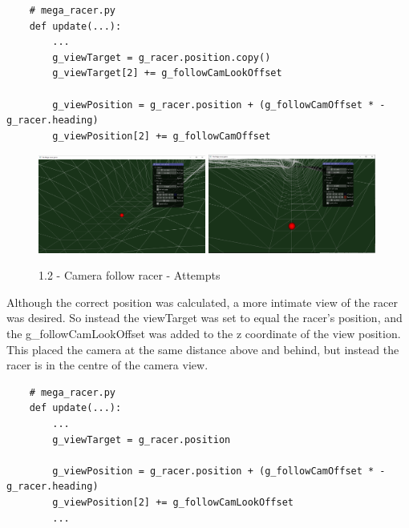 \documentclass[a4 paper, 12pt]{article}
\begin{document}
\begin{lstlisting}
    # mega_racer.py
    def update(...):
        ...
        g_viewTarget = g_racer.position.copy()
        g_viewTarget[2] += g_followCamLookOffset
    
        g_viewPosition = g_racer.position + (g_followCamOffset * -g_racer.heading)
        g_viewPosition[2] += g_followCamOffset
\end{lstlisting}

\begin{figure} [H]
    \includegraphics[width=0.49\textwidth, frame]
        {./images/mega_racer/1.2_1.PNG}
        \includegraphics[width=0.49\textwidth, frame]
        {./images/mega_racer/1.2_2.PNG}
    \caption{1.2 - Camera follow racer - Attempts}
\end{figure}

Although the correct position was calculated, a more intimate view of the racer was desired. So instead the viewTarget was set to equal the racer's position, and the g\_followCamLookOffset was added to the z coordinate of the view position. This placed the camera at the same distance above and behind, but instead the racer is in the centre of the camera view.
    \begin{lstlisting}
    # mega_racer.py
    def update(...):
        ...
        g_viewTarget = g_racer.position

        g_viewPosition = g_racer.position + (g_followCamOffset * -g_racer.heading)
        g_viewPosition[2] += g_followCamLookOffset
        ...
    \end{lstlisting}
\end{document}
